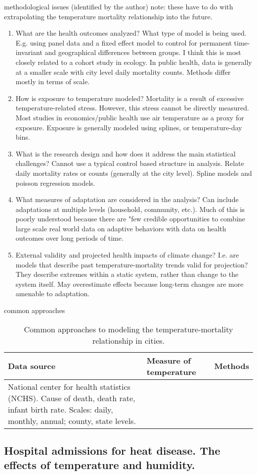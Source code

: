 \documentclass[11pt]{article}
\begin{document}
methodological issues (identified by the author) note: these have to do with extrapolating the temperature mortality relationship into the future.

\begin{enumerate}
\item What are the health outcomes analyzed? What type of model is being used. E.g. using panel data and a fixed effect model to control for permanent time-invariant and geographical differences between groups. I think this is most closely related to a cohort study in ecology. In public health, data is generally at a smaller scale with city level daily mortality counts. Methods differ mostly in terms of scale.
\item How is exposure to temperature modeled? Mortality is a result of excessive temperature-related stress. However, this stress cannot be directly measured. Most studies in economics/public health use air temperature as a proxy for exposure. Exposure is generally modeled using splines, or temperature-day bins. 
\item What is the research design and how does it address the main statistical challenges? Cannot use a typical control based structure in analysis. Relate daily mortality rates or counts (generally at the city level). Spline models and poisson regression models. 
\item What measures of adaptation are considered in the analysis? Can include adaptations at multiple levels (household, community, etc.). Much of this is poorly understood because there are "few credible opportunities to combine large scale real world data on adaptive behaviors with data on health outcomes over long periods of time. 
\item External validity and projected health impacts of climate change? I.e. are models that describe past temperature-mortality trends valid for projection? They describe extremes within a static system, rather than change to the system itself. May overestimate effects because long-term changes are more amenable to adaptation. 
\end{enumerate}

common approaches 
\begin{table}[h]
	\caption{Common approaches to modeling the temperature-mortality relationship in cities.}
	\centering
	\label{approaches}
	\begin{tabular}{p{1.75in}p{1.75in}p{1.75in}}
		\toprule
		Data source & Measure of temperature & Methods \\
		\midrule
		National center for health statistics (NCHS). Cause of death, death rate, infant birth rate. Scales: daily, monthly, annual; county, state levels. & & \\
		\bottomrule
	\end{tabular}
\end{table}




\subsection*{\citep{Schwartz2004} Hospital admissions for heat disease. The effects of temperature and humidity.}


\end{document}
